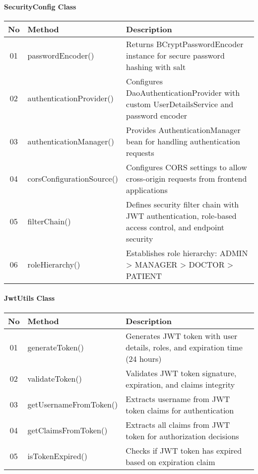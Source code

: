 \documentclass[12pt,a4paper]{article}
\begin{document}
\paragraph{SecurityConfig Class}
\begin{longtable}{|c|l|p{8cm}|}
\hline
\textbf{No} & \textbf{Method} & \textbf{Description} \\
\hline
01 & passwordEncoder() & Returns BCryptPasswordEncoder instance for secure password hashing with salt \\
\hline
02 & authenticationProvider() & Configures DaoAuthenticationProvider with custom UserDetailsService and password encoder \\
\hline
03 & authenticationManager() & Provides AuthenticationManager bean for handling authentication requests \\
\hline
04 & corsConfigurationSource() & Configures CORS settings to allow cross-origin requests from frontend applications \\
\hline
05 & filterChain() & Defines security filter chain with JWT authentication, role-based access control, and endpoint security \\
\hline
06 & roleHierarchy() & Establishes role hierarchy: ADMIN > MANAGER > DOCTOR > PATIENT \\
\hline
\end{longtable}

\paragraph{JwtUtils Class}
\begin{longtable}{|c|l|p{8cm}|}
\hline
\textbf{No} & \textbf{Method} & \textbf{Description} \\
\hline
01 & generateToken() & Generates JWT token with user details, roles, and expiration time (24 hours) \\
\hline
02 & validateToken() & Validates JWT token signature, expiration, and claims integrity \\
\hline
03 & getUsernameFromToken() & Extracts username from JWT token claims for authentication \\
\hline
04 & getClaimsFromToken() & Extracts all claims from JWT token for authorization decisions \\
\hline
05 & isTokenExpired() & Checks if JWT token has expired based on expiration claim \\
\hline
\end{longtable}
\end{document}
